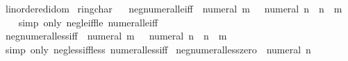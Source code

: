 \begin{isabellebody}
\isanewline
{}\isamarkupfalse%
%
\isadelimdocument
%
\endisadelimdocument
%
\isatagdocument
%
\isamarkuptrue%
%
\endisatagdocument
{\isafolddocument}%
%
\isadelimdocument
%
\endisadelimdocument
{}\isamarkupfalse%
\ linordered{\isacharunderscore}{\kern0pt}idom\isanewline
{}\isanewline
\isanewline
{}\isamarkupfalse%
\ ring{\isacharunderscore}{\kern0pt}char{\isacharunderscore}{\kern0pt}{}%
\isadelimproof
\ %
\endisadelimproof
%
\isatagproof
\isacommand{{\isachardot}{\kern0pt}{\isachardot}{\kern0pt}}\isamarkupfalse%
%
\endisatagproof
{\isafoldproof}%
%
\isadelimproof
%
\endisadelimproof
\isanewline
\isanewline
{}\isamarkupfalse%
\ neg{\isacharunderscore}{\kern0pt}numeral{\isacharunderscore}{\kern0pt}le{\isacharunderscore}{\kern0pt}iff{\isacharcolon}{\kern0pt}\ {\isachardoublequoteopen}{\isacharminus}{\kern0pt}\ numeral\ m\ {\isasymle}\ {\isacharminus}{\kern0pt}\ numeral\ n\ {\isasymlongleftrightarrow}\ n\ {\isasymle}\ m{\isachardoublequoteclose}\isanewline
%
\isadelimproof
\ \ %
\endisadelimproof
%
\isatagproof
{}\isamarkupfalse%
\ {\isacharparenleft}{\kern0pt}simp\ only{\isacharcolon}{\kern0pt}\ neg{\isacharunderscore}{\kern0pt}le{\isacharunderscore}{\kern0pt}iff{\isacharunderscore}{\kern0pt}le\ numeral{\isacharunderscore}{\kern0pt}le{\isacharunderscore}{\kern0pt}iff{\isacharparenright}{\kern0pt}%
\endisatagproof
{\isafoldproof}%
%
\isadelimproof
\isanewline
%
\endisadelimproof
\isanewline
{}\isamarkupfalse%
\ neg{\isacharunderscore}{\kern0pt}numeral{\isacharunderscore}{\kern0pt}less{\isacharunderscore}{\kern0pt}iff{\isacharcolon}{\kern0pt}\ {\isachardoublequoteopen}{\isacharminus}{\kern0pt}\ numeral\ m\ {\isacharless}{\kern0pt}\ {\isacharminus}{\kern0pt}\ numeral\ n\ {\isasymlongleftrightarrow}\ n\ {\isacharless}{\kern0pt}\ m{\isachardoublequoteclose}\isanewline
%
\isadelimproof
\ \ %
\endisadelimproof
%
\isatagproof
{}\isamarkupfalse%
\ {\isacharparenleft}{\kern0pt}simp\ only{\isacharcolon}{\kern0pt}\ neg{\isacharunderscore}{\kern0pt}less{\isacharunderscore}{\kern0pt}iff{\isacharunderscore}{\kern0pt}less\ numeral{\isacharunderscore}{\kern0pt}less{\isacharunderscore}{\kern0pt}iff{\isacharparenright}{\kern0pt}%
\endisatagproof
{\isafoldproof}%
%
\isadelimproof
\isanewline
%
\endisadelimproof
\isanewline
{}\isamarkupfalse%
\ neg{\isacharunderscore}{\kern0pt}numeral{\isacharunderscore}{\kern0pt}less{\isacharunderscore}{\kern0pt}zero{\isacharcolon}{\kern0pt}\ {\isachardoublequoteopen}{\isacharminus}{\kern0pt}\ numeral\ n\ {\isacharless}{\kern0pt}\ {}{\isachardoublequoteclose}\isanewline

\end{isabellebody}
